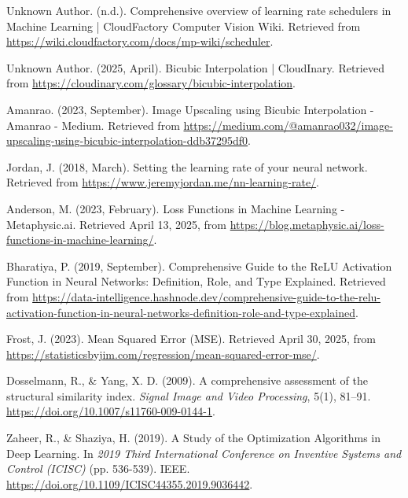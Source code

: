 \documentclass[twocolumn]{article}
\begin{document}
\begin{thebibliography}{99}
     Unknown Author. (n.d.). Comprehensive overview of learning rate schedulers in Machine Learning | CloudFactory Computer Vision Wiki. Retrieved from \url{https://wiki.cloudfactory.com/docs/mp-wiki/scheduler}.
    
     Unknown Author. (2025, April). Bicubic Interpolation | CloudInary. Retrieved from \url{https://cloudinary.com/glossary/bicubic-interpolation}.
    
     Amanrao. (2023, September). Image Upscaling using Bicubic Interpolation - Amanrao - Medium. Retrieved from \url{https://medium.com/@amanrao032/image-upscaling-using-bicubic-interpolation-ddb37295df0}.
    
     Jordan, J. (2018, March). Setting the learning rate of your neural network. Retrieved from \url{https://www.jeremyjordan.me/nn-learning-rate/}.
    
     Anderson, M. (2023, February). Loss Functions in Machine Learning - Metaphysic.ai. Retrieved April 13, 2025, from \url{https://blog.metaphysic.ai/loss-functions-in-machine-learning/}.
    
     Bharatiya, P. (2019, September). Comprehensive Guide to the ReLU Activation Function in Neural Networks: Definition, Role, and Type Explained. Retrieved from \href{https://data-intelligence.hashnode.dev/comprehensive-guide-to-the-relu-activation-function-in-neural-networks-definition-role-and-type-explained}{https://data-intelligence.hashnode.dev/comprehensive-guide-to-the-relu-activation-function-in-neural-networks-definition-role-and-type-explained}.
    
     Frost, J. (2023). Mean Squared Error (MSE). Retrieved April 30, 2025, from \url{https://statisticsbyjim.com/regression/mean-squared-error-mse/}.
    
     Dosselmann, R., \& Yang, X. D. (2009). A comprehensive assessment of the structural similarity index. \textit{Signal Image and Video Processing}, 5(1), 81–91. \url{https://doi.org/10.1007/s11760-009-0144-1}.
    
     Zaheer, R., \& Shaziya, H. (2019). A Study of the Optimization Algorithms in Deep Learning. In \textit{2019 Third International Conference on Inventive Systems and Control (ICISC)} (pp. 536-539). IEEE. \url{https://doi.org/10.1109/ICISC44355.2019.9036442}.
    

\end{thebibliography}
\end{document}
